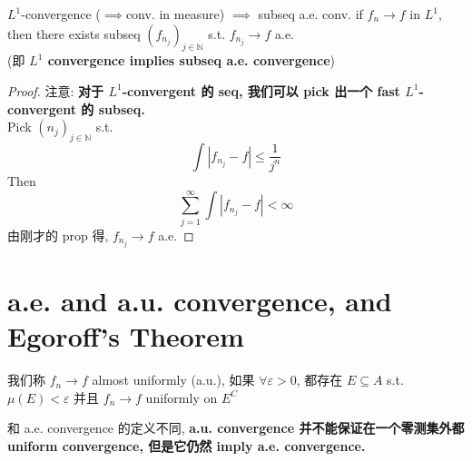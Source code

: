 \documentclass[lang=cn,11pt]{elegantbook}
\begin{document}
\begin{corollary}{$L^1$-convergence ($\implies$conv. in measure) $\implies$ subseq a.e. conv. }
    if $f_n \rightarrow f$ in $L^1$, then there exists subseq $(f_{n_j})_{j\in \mathbb{N}}$ s.t. $f_{n_j} \rightarrow f$ a.e. \\
    (即 \textbf{$L^1$ convergence implies subseq a.e. convergence})
\end{corollary}
\begin{proof}
    注意: \textbf{对于 $L^1$-convergent 的 seq, 我们可以 pick 出一个 fast $L^1$-convergent 的 subseq.}\\
    Pick $(n_j)_{j\in\mathbb{N}}$ s.t. 
    \[
    \int |f_{n_j} - f| \leq \frac{1}{j^n}
    \]
    Then \[
    \sum_{j=1}^\infty \int |f_{n_j}-f| < \infty
    \]
    由刚才的 prop 得, $f_{n_j}\rightarrow f$ a.e.
\end{proof}
  \begin{comment}
\begin{remark}
这里直接证明了 $L^1$-convergence $\implies$ subseq a.e. conv, 而我们也可以\textbf{在中间加上 conv. in measure }这一过渡.\\
我们可以通过\[ \mu(B_{n,k}^c)  \leq k \int |f_n-f|\] 的关系, 加上 $L^1$-convergence 对这个积分的控制, 简单得到 \textbf{$L^1$ convergent implies convergent in measure}.\\
至于 convergent in measure 证明 subseq a.e. conv, 这一部分在 Folland 2.30. \textbf{Convergent in measure implies Cauchy in measure, and Cauchy in measure implies subseq a.e. conv.} (这个证明看起来还挺麻烦的.)
  
    我们取一个 subseq $(g_j) := (f_{n_j})$, 其满足 \[
    \mu( E_j := \{x: |g_j(x)- g_{j+1} (x) | \geq \frac{1}{2^j}\}) \leq \frac{1}{2^j} 
    \]

\end{remark}
\end{comment}




\section{a.e. and a.u. convergence, and Egoroff's Theorem}
\begin{definition}
    我们称 $f_n\rightarrow f$ almost uniformly (a.u.), 如果 $\forall \varepsilon > 0$, 都存在 $E \subseteq A$ s.t. $\mu(E) < \varepsilon$ 并且 $f_n \rightarrow f$ uniformly on $E^C$
\end{definition}
\begin{remark}
    和 a.e. convergence 的定义不同, \textbf{a.u. convergence 并不能保证在一个零测集外都 uniform convergence, 但是它仍然 imply a.e. convergence.}
\end{remark}
\end{document}
